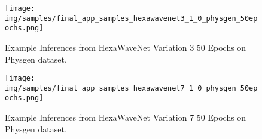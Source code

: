 		\begin{figure}[H]
			\centering
			\texttt{[image: img/samples/final\_app\_samples\_hexawavenet3\_1\_0\_physgen\_50epochs.png]}
			\caption[Example Inferences from HexaWaveNet Variation 3 50 Epochs on Physgen dataset.]{Example Inferences from HexaWaveNet Variation 3 50 Epochs on Physgen dataset.}
			\label{fig:experiment_architecture_hexa_3_examples}
		\end{figure}
		\FloatBarrier
		
		\begin{figure}[H]
			\centering
			\texttt{[image: img/samples/final\_app\_samples\_hexawavenet7\_1\_0\_physgen\_50epochs.png]}
			\caption[Example Inferences from HexaWaveNet Variation 7 50 Epochs on Physgen dataset.]{Example Inferences from HexaWaveNet Variation 7 50 Epochs on Physgen dataset.}
			\label{fig:experiment_architecture_hexa_7_examples}
		\end{figure}
		\FloatBarrier
		
	\clearpage
		
